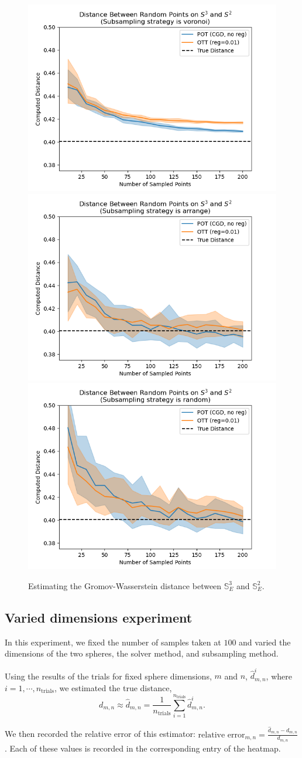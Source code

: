 \documentclass{article}
\begin{document}
\begin{figure}[hb]
    \centering
    \includegraphics[width=0.3\linewidth]{../plots_same_axis/voronoi_trials/n_20_d_3_d2.png}
    \includegraphics[width=0.3\linewidth]{../plots_same_axis/arrange_trials/n_20_d_3_d2.png}
    \includegraphics[width=0.3\linewidth]{../plots_same_axis/random_trials/n_20_d_3_d2.png}
    \caption{Estimating the Gromov-Wasserstein distance between $\mathbb{S}^3_E$ and $\mathbb{S}^2_E$.}
\end{figure}

\subsection{Varied dimensions experiment}
In this experiment, we fixed the number of samples taken at $100$ and varied
the dimensions of the two spheres, the solver method, and subsampling method.

Using the results of the trials for fixed sphere dimensions, $m$ and $n$,
$\hat{d}^i_{m, n}$, where $i = 1, \cdots, n_\textrm{trials}$, we estimated the
true distance,
\[ d_{m, n} \approx \hat{d}_{m, n} =
    \frac{1}{n_\textrm{trials}}\sum_{i=1}^{n_\textrm{trials}} \hat{d}^i_{m, n}.
\]

We then recorded the relative error of this estimator: $\textrm{relative
error}_{m, n} = \frac{\hat{d}_{m, n} - d_{m, n}}{d_{m, n}}$. Each of these
values is recorded in the corresponding entry of the heatmap.
\end{document}
